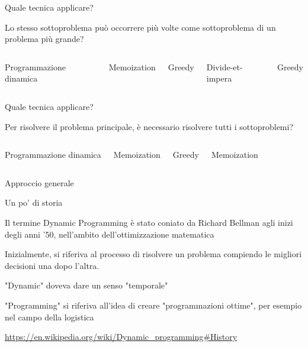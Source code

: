 \begin{frame}{Quale tecnica applicare?}

Lo stesso sottoproblema può occorrere più volte come sottoproblema di un problema più grande?

\bigskip
\begin{columns}[T]
\BIL
\item \alert{Programmazione dinamica}
\item \alert{Memoization}
\item Greedy
\EIL
{}
\BIL
\item Divide-et-impera
\item Greedy
\EIL
\end{columns}

\end{frame}

\begin{frame}{Quale tecnica applicare?}

\BIL
\item Per risolvere il problema principale, è necessario risolvere tutti i sottoproblemi?
\EIL

\bigskip
\begin{columns}[T]
\BIL
\item \alert{Programmazione dinamica}
\item \alert{Memoization}
\EIL
{}
\BIL
\item Greedy
\item \alert{Memoization}
\EIL
\end{columns}

\end{frame}


\begin{frame}{Approccio generale}

\vspace{-12pt}

\end{frame}

\begin{frame}{Un po' di storia}

\BIL
\item Il termine \alert{Dynamic Programming} è stato coniato da Richard Bellman 
agli inizi degli anni '50, nell'ambito dell'ottimizzazione matematica   
\item Inizialmente, si riferiva al processo di risolvere un problema compiendo
le migliori decisioni una dopo l'altra.
\item "Dynamic" doveva dare un senso "temporale"
\item "Programming" si riferiva all'idea di creare "programmazioni ottime",
per esempio nel campo della logistica
\EIL

\bigskip
\url{https://en.wikipedia.org/wiki/Dynamic_programming\#History}

\end{frame}



